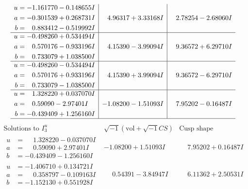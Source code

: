 \documentclass[1p]{elsarticle_modified}
\theoremstyle{definition}
\newcommand{\I}{\sqrt{-1}}
\begin{document}
$$\begin{array}{c|c|c}
\begin{aligned}
u &= -1.161770 - 0.148655 I \\
a &= -0.301539 + 0.268731 I \\
b &= \phantom{-}0.883412 - 0.519992 I\end{aligned}
 & \phantom{-}4.96317 + 3.33168 I & \phantom{-}2.78254 - 2.68060 I \\ \hline\begin{aligned}
u &= -0.498260 + 0.534494 I \\
a &= \phantom{-}0.570176 - 0.933196 I \\
b &= \phantom{-}0.733079 + 1.038500 I\end{aligned}
 & \phantom{-}4.15390 - 3.99094 I & \phantom{-}9.36572 + 6.29710 I \\ \hline\begin{aligned}
u &= -0.498260 - 0.534494 I \\
a &= \phantom{-}0.570176 + 0.933196 I \\
b &= \phantom{-}0.733079 - 1.038500 I\end{aligned}
 & \phantom{-}4.15390 + 3.99094 I & \phantom{-}9.36572 - 6.29710 I \\ \hline\begin{aligned}
u &= \phantom{-}1.328220 + 0.037070 I \\
a &= \phantom{-}0.59090 - 2.97401 I \\
b &= -0.439409 + 1.256160 I\end{aligned}
 & -1.08200 - 1.51093 I & \phantom{-}7.95202 - 0.16487 I\\
 \hline 
 \end{array}$$\newpage$$\begin{array}{c|c|c}  
\text{Solutions to }I^u_{3}& \I (\text{vol} + \sqrt{-1}CS) & \text{Cusp shape}\\
 \hline 
\begin{aligned}
u &= \phantom{-}1.328220 - 0.037070 I \\
a &= \phantom{-}0.59090 + 2.97401 I \\
b &= -0.439409 - 1.256160 I\end{aligned}
 & -1.08200 + 1.51093 I & \phantom{-}7.95202 + 0.16487 I \\ \hline\begin{aligned}
u &= -1.406710 + 0.134721 I \\
a &= \phantom{-}0.358797 - 0.109163 I \\
b &= -1.152130 + 0.551928 I\end{aligned}
 & \phantom{-}0.54391 - 3.84947 I & \phantom{-}6.11362 + 2.50531 I \\ \hline\begin{aligned}

\end{aligned}
\end{array}$$
\end{document}
